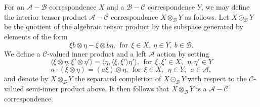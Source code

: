 \documentclass[11pt, letterpaper,final]{amsart}
\newcommand{\A}{{\mathcal{A}}}
\newcommand{\B}{{\mathcal{B}}}
\newcommand{\C}{{\mathcal{C}}}
\renewcommand{\H}{{\mathcal{H}}}
\newcommand{\K}{{\mathcal{K}}}
\renewcommand{\O}{{\mathcal{O}}}
\newcommand{\T}{{\mathcal{T}}}
\newcommand{\bT}{\mathbb{T}}
\theoremstyle{definition}
\newtheorem{dfn}[thm]{Definition}
\begin{document}
%

For an $\A-\B$ correspondence $X$ and a $\B-\C$ correspondence $Y$, we may define the interior tensor product $\A -\C$ correspondence $X \otimes_{\B} Y$ as follows. Let $X \odot_{\B} Y$ be the quotient of the algebraic tensor product by the subspace generated by elements of the form
$$
\xi b \otimes \eta - \xi \otimes b \eta, \ \ \text{for} \ \ \xi \in X, \ \eta \in Y, \ b \in \B.
$$
We define a $\C$-valued inner product and a left $\A$ action by setting
$$
\langle \xi \otimes \eta, \xi' \otimes \eta' \rangle = \langle \eta , \langle \xi ,\xi' \rangle \eta' \rangle, \ \ \text{for} \ \ \xi,\xi' \in X, \ \ \eta,\eta' \in Y
$$
$$
a \cdot (\xi \otimes \eta) = (a\xi) \otimes \eta, \ \ \text{for} \ \ \xi \in X, \ \ \eta \in Y, \ \ a \in \A,
$$
and denote by $X \otimes_{\B} Y$ the separated completion of $X \odot_{\B} Y$ with respect to the $\C$-valued semi-inner product above. It then follows that $X\otimes_{\B} Y$ is a $\A-\C$ correspondence. 
\end{document}
